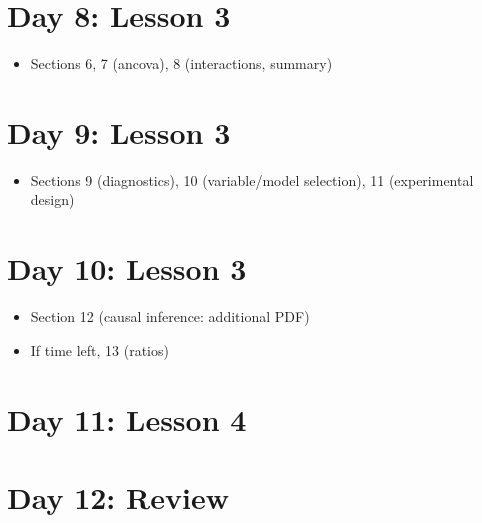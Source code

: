 \documentclass[11pt]{article}
\begin{document}
\section*{Day 8: Lesson 3}
\label{sec:org6f322e8}
\begin{itemize}
\item Sections 6, 7 (ancova), 8 (interactions, summary)
\end{itemize}
\section*{Day 9: Lesson 3}
\label{sec:org2142285}
\begin{itemize}
\item Sections 9 (diagnostics), 10 (variable/model selection), 11 (experimental design)
\end{itemize}
\section*{Day 10: Lesson 3}
\label{sec:org3d49cf0}
\begin{itemize}
\item Section 12 (causal inference: additional PDF)
\item If time left, 13 (ratios)
\end{itemize}
\section*{Day 11: Lesson 4}
\label{sec:org32ab79d}

\section*{Day 12: Review}
\label{sec:org1596449}
\end{document}
